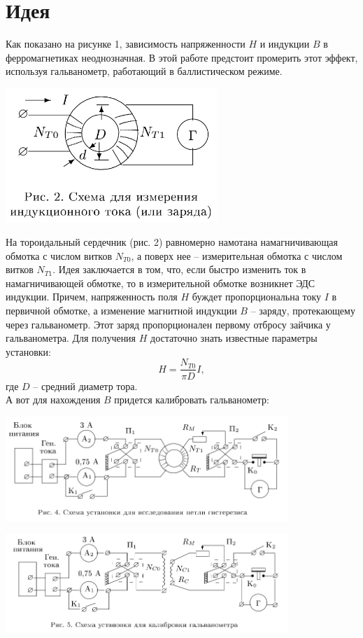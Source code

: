 \section*{Идея}
Как показано на рисунке 1, зависимость напряженности $H$ и индукции $B$ в ферромагнетиках неоднозначная. В этой работе предстоит промерить этот эффект, используя гальванометр, работающий в баллистическом режиме.
\begin{center}
\includegraphics[width=0.60\textwidth]{2.png}
\end{center}
\newpage
На тороидальный сердечник (рис. 2) равномерно намотана намагничивающая обмотка с числом витков $N_{T0}$, а поверх нее -- измерительная обмотка с числом витков $N_{T1}$. Идея заключается в том, что, если быстро изменить ток в намагничивающей обмотке, то в измерительной обмотке возникнет ЭДС индукции. Причем, напряженность поля $H$ буждет пропорциональна току $I$ в первичной обмотке, а изменение магнитной индукции $B$ -- заряду, протекающему через гальванометр. Этот заряд пропорционален первому отбросу зайчика у гальванометра.
Для получения $H$ достаточно знать известные параметры установки:
$$H=\frac{N_{T0}}{\pi D}I,$$
где $D$ -- средний диаметр тора.\\
А вот для нахождения $B$ придется калибровать гальванометр:
\begin{center}
\includegraphics[width=0.80\textwidth]{3.png}
\end{center}
\begin{center}
\includegraphics[width=0.80\textwidth]{4.png}
\end{center}
